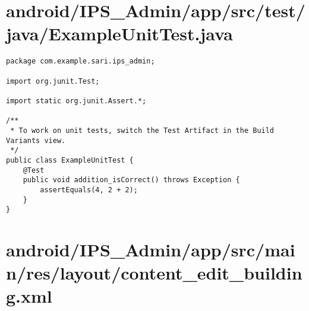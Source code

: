 \section{android/IPS\_Admin/app/src/test/java/ExampleUnitTest.java}
\begin{lstlisting}package com.example.sari.ips_admin;

import org.junit.Test;

import static org.junit.Assert.*;

/**
 * To work on unit tests, switch the Test Artifact in the Build Variants view.
 */
public class ExampleUnitTest {
    @Test
    public void addition_isCorrect() throws Exception {
        assertEquals(4, 2 + 2);
    }
}
\end{lstlisting}
\newpage
\section{android/IPS\_Admin/app/src/main/res/layout/content_edit_building.xml}
